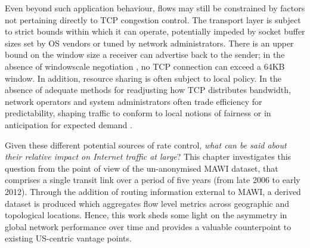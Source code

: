 Even beyond such application behaviour, flows may still be constrained by factors not pertaining directly to TCP congestion control.
The transport layer is subject to strict bounds within which it can operate, potentially impeded by socket buffer sizes set by OS vendors or tuned by network administrators. There is an upper bound on the window size a receiver can advertise back to the sender; in the absence of windowscale negotiation \cite{braden1989rfc}, no TCP connection can exceed a 64KB window. In addition, resource sharing is often subject to local policy.
In the absence of adequate methods for readjusting how TCP distributes bandwidth, network operators and system administrators often trade efficiency for predictability, shaping traffic to conform to local notions of fairness or in anticipation for expected demand \cite{ispTrafficShaping}.

Given these different potential sources of rate control, \emph{what can be said about their relative impact on Internet traffic at large}?
This chapter investigates this question from the point of view of the un-anonymised MAWI dataset, that comprises a single transit link over a period of five years (from late 2006 to early 2012). Through the addition of routing information external to MAWI, a derived dataset is produced which aggregates flow level metrics across geographic and topological locations. Hence, this work sheds some light on the asymmetry in global network performance over time and provides a valuable counterpoint to existing US-centric vantage points.


